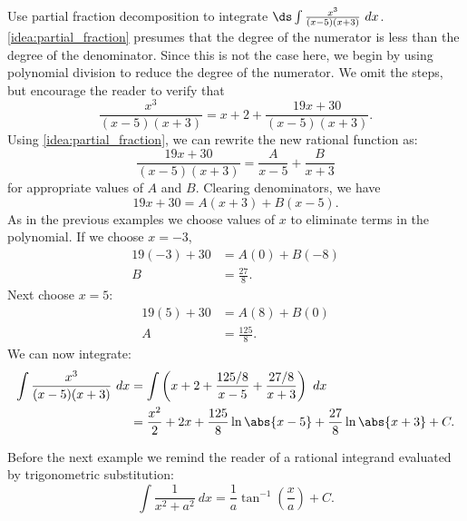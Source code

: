 \begin{example}\label{ex_pf4}
Use partial fraction decomposition to integrate $\ds \int \frac{x^3}{(x-5)(x+3)}\ dx$.
\solution
\autoref{idea:partial_fraction} presumes that the degree of the numerator is less than the degree of the denominator. Since this is not the case here, we begin by using polynomial division to reduce the degree of the numerator. We omit the steps, but encourage the reader to verify that
\[\frac{x^3}{(x-5)(x+3)} = x+2+\frac{19x+30}{(x-5)(x+3)}.\]
Using \autoref{idea:partial_fraction}, we can rewrite the new rational function as:
\[\frac{19x+30}{(x-5)(x+3)} = \frac{A}{x-5} + \frac{B}{x+3}\]
for appropriate values of $A$ and $B$. Clearing denominators, we have 
\[19x+30=A(x+3)+B(x-5).\]
As in the previous examples we choose values of $x$ to eliminate terms in the polynomial.  If we choose $x=-3$,
\begin{align*}
 19(-3)+30&=A(0) + B(-8) \\
 B&= \frac{27}{8}.
\end{align*}
Next choose $x=5$:
\begin{align*}
 19(5)+30&=A(8) + B(0)\\
 A&= \frac{125}{8}.
\end{align*}
We can now integrate:
\begin{align*}
	\int \frac{x^3}{(x-5)(x+3)}\ dx
	&= \int\left(x+2+\frac{125/8}{x-5}+\frac{27/8}{x+3}\right)\ dx \\
	&= \frac{x^2}2+2x+\frac{125}{8}\ln\abs{x-5}+\frac{27}8\ln\abs{x+3}+C.
\end{align*}
\end{example}

Before the next example we remind the reader of a rational integrand evaluated by trigonometric substitution:
\[\int\frac1{x^2+a^2}\ dx=\frac1a\tan^{-1}\left(\frac xa\right) + C.\]

